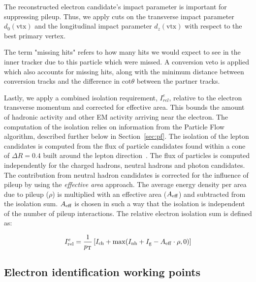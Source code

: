 The reconstructed electron candidate's impact parameter is important for suppressing pileup.
Thus, we apply cuts on the transverse impact parameter  $d_0(\mathrm{vtx})$ and
the longitudinal impact parameter $d_z(\mathrm{vtx})$ with respect to the best primary vertex.

The term "missing hits" refers to how many hits we would expect to see in the
inner tracker due to this particle which were missed. A conversion veto is applied which
also accounts for missing hits, along with the minimum distance between conversion tracks
and the difference in $\mathrm{cot} \theta$ between the partner tracks.

Lastly, we apply a combined isolation requirement, 
$I_{rel}^{e}$, relative to the electron transverse momentum and corrected for
effective area. This bounds the amount of hadronic activity and other EM activity
arriving near the electron.
The computation of the isolation relies on information from the Particle Flow algorithm, described further below in Section~\ref{sec:pf}.
The isolation of the lepton candidates is computed from the flux of particle candidates
found within a cone of $\Delta R = 0.4$ built around the lepton direction~\cite{CMS-PAS-PFT-10-002}.
The flux of particles is computed independently for the charged hadrons, neutral hadrons and photon candidates.
The contribution from neutral hadron candidates is corrected for the influence of pileup by using the \textit{effective area} approach.  
The average energy density per area due to pileup ($\rho$) is multiplied with an effective area ($A_{\rm eff}$) and subtracted from the isolation sum. 
$A_{\rm eff}$ is chosen in such a way that the isolation is independent of the number of pileup interactions.
The relative electron isolation sum is defined as: 

\begin{equation}
I^{e}_{\rm rel}=\frac{1}{p_{\rm T}}  \left[ I_{\rm ch}+\max(I_{\rm nh}+I_{\rm g}-A_{\rm eff}\cdot\rho,0) \right]
\label{eq:eleisol}
\end{equation}

\subsection{Electron identification working points}

